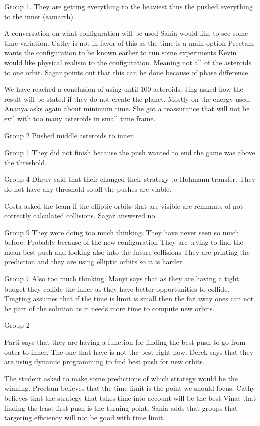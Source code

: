 Group 1.
They are getting everything to the heaviest thus the pushed everything to the inner (samarth).

A conversation on what configuration will be used
Sania would like to see some time variation.
Cathy is not in favor of this as the time is a main option
Preetam wants the configuration to be known earlier to run some experiments
Kevin would like physical realism to the configuration. Meaning not all of the asteroids to one orbit.
Sagar points out that this can be done because of phase difference.

We have reached a conclusion of using until 100 asteroids.
Jing asked how the result will be stated if they do not create the planet.
Mostly on the energy used.
Ananya asks again about minimum time.
She got a reassurance that will not be evil with too many asteroids in small time frame.

Group 2
Pushed middle asteroids to inner.

Group 1
They did not finish because the push wanted to end the game was above the threshold.

Group 4
Dhruv said that their changed their strategy to Hohmann transfer. They do not have any threshold so all the pushes are viable.

Costa asked the team if the elliptic orbits that are visible are remnants of not correctly calculated collisions.
Sagar answered no.

Group 9
They were doing too much thinking. They have never seen so much before. Probably because of the new configuration
They are trying to find the mean best push and looking also into the future collisions
They are printing the prediction and they are using elliptic orbits so it is harder

Group 7 
Also too much thinking. Manyi says that as they are having a tight budget they 
collide the inner as they have better opportunities to collide.
Tingting assumes that if the time is limit is small then the far away ones can 
not be part of the solution as it needs more time to compute new orbits.

Group 2

Parti says that they are having a function for finding the best push to go from outer to inner.
The one that have is not the best right now.
Derek says that they are using dynamic programming to find best push for new orbits.

The student asked to make some predictions of which strategy would be the winning.
Preetam believes that the time limit is the point we should focus.
Cathy believes that the strategy that takes time into account will be the best
Vinat that finding the least first push is the turning point.
Sania adds that groups that targeting efficiency will not be good with time limit.
